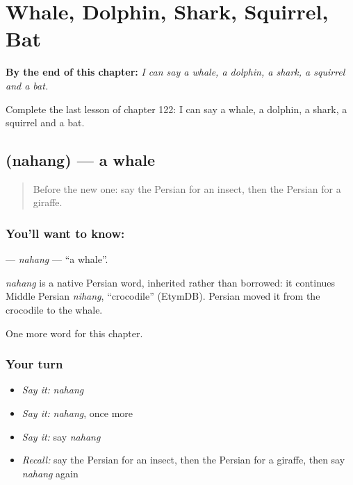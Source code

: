
\chapter{Whale, Dolphin, Shark, Squirrel, Bat}
\label{ch:fa-whale-dolphin-shark-squirrel-bat}

\begin{chapteropening}
\textbf{By the end of this chapter:} \emph{I can say a whale, a dolphin, a shark, a squirrel and a bat.}

Complete the last lesson of chapter 122: I can say a whale, a dolphin, a shark, a squirrel and a bat.
\end{chapteropening}

\section[\texorpdfstring{\fa{نهنگ} (nahang)}{نهنگ (nahang)}]{ (nahang) — a whale}

\label{lesson:FA-C122-nahang}



\begin{quote}
Before the new one: say the Persian for an insect, then the Persian for a giraffe.
\end{quote}

\subsection*{You'll want to know: }
\textbf{} — \emph{nahang} — \textquotedblleft{}a whale\textquotedblright{}.

\begin{cousinweb}
\emph{nahang} is a native Persian word, inherited rather than borrowed: it continues Middle Persian \emph{nihang}, \textquotedblleft{}crocodile\textquotedblright{} (EtymDB). Persian moved it from the crocodile to the whale.
\end{cousinweb}

\begin{grammarlens}[title={What you've built}]
One more word for this chapter.
\end{grammarlens}

\subsection*{Your turn}
\begin{itemize}
\raggedright
  \item \emph{Say it:} \emph{nahang}
  \item \emph{Say it:} \emph{nahang}, once more
  \item \emph{Say it:} say \emph{nahang}
  \item \emph{Recall:} say the Persian for an insect, then the Persian for a giraffe, then say \emph{nahang} again
\end{itemize}

